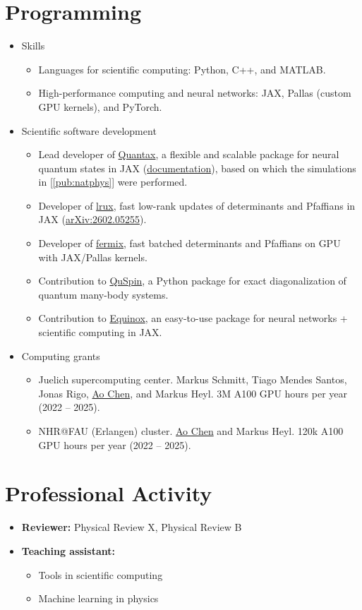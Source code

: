 \documentclass[a4paper,11pt]{article}
\newcommand{\me}{\uline{Ao Chen}}
\newcommand{\resumeItem}[1]{\item\small{#1 \vspace{-2pt}}}
\newcommand{\resumeItemListStart}{\begin{itemize}}
\newcommand{\resumeItemListEnd}{\end{itemize}\vspace{-5pt}}
\begin{document}
\section{Programming}
  \begin{itemize}[leftmargin=0.15in, label={}]
    \item \small Skills
    \resumeItemListStart
      \resumeItem{Languages for scientific computing: Python, C++, and MATLAB.}
      \resumeItem{High-performance computing and neural networks: JAX, Pallas (custom GPU kernels), and PyTorch.}
    \resumeItemListEnd

    \item \small Scientific software development
    \resumeItemListStart
      \resumeItem{Lead developer of \href{https://github.com/ChenAo-Phys/quantax}{Quantax}, a flexible and scalable package for neural quantum states in JAX
        (\href{https://chenao-phys.github.io/quantax/}{documentation}), based on which the simulations in [\ref{pub:natphys}] were performed.}
      \resumeItem{Developer of \href{https://github.com/ChenAo-Phys/lrux}{lrux}, fast low-rank updates of determinants and Pfaffians in JAX
        (\href{https://arxiv.org/abs/2602.05255}{arXiv:2602.05255}).}
      \resumeItem{Developer of \href{https://github.com/ChenAo-Phys/fermix}{fermix}, fast batched determinants and Pfaffians on GPU with JAX/Pallas kernels.}
      \resumeItem{Contribution to \href{https://github.com/QuSpin/QuSpin}{QuSpin}, a Python package for exact diagonalization of quantum many-body systems.}
      \resumeItem{Contribution to \href{https://github.com/patrick-kidger/equinox}{Equinox}, an easy-to-use package for neural networks + scientific computing in JAX.}
    \resumeItemListEnd

    \item \small Computing grants
    \resumeItemListStart
      \resumeItem{Juelich supercomputing center. Markus Schmitt, Tiago Mendes Santos, Jonas Rigo, \me, and Markus Heyl.
        3M A100 GPU hours per year (2022 -- 2025).}
      \resumeItem{NHR@FAU (Erlangen) cluster. \me{} and Markus Heyl. 120k A100 GPU hours per year (2022 -- 2025).}
    \resumeItemListEnd
  \end{itemize}

\section{Professional Activity}
  \begin{itemize}[leftmargin=0.15in, label={}]
    \item \small \textbf{Reviewer:} Physical Review X, Physical Review B
    \item \small \textbf{Teaching assistant:}
    \resumeItemListStart
      \resumeItem{Tools in scientific computing}
      \resumeItem{Machine learning in physics}
    \resumeItemListEnd
  \end{itemize}
\end{document}
